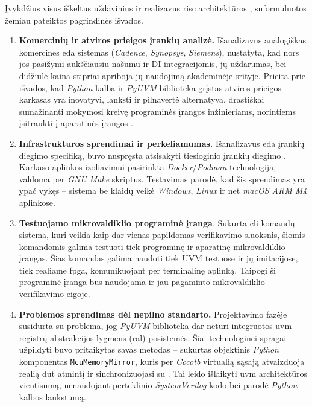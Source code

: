 
Įvykdžius visus iškeltus uždavinius ir realizavus \gls{risc} architektūros   , suformuluotos žemiau pateiktos pagrindinės išvados.

\begin{enumerate}
	\item \textbf{Komercinių ir atviros prieigos įrankių analizė.} Išanalizavus analogiškas komercines \gls{eda} sistemas (\textit{Cadence}, \textit{Synopsys}, \textit{Siemens}), nustatyta, kad nors jos pasižymi aukščiausiu našumu ir DI integracijomis, jų uždarumas,  bei didžiulė kaina stipriai apriboja jų naudojimą akademinėje srityje. Prieita prie išvados, kad \textit{Python} kalba ir \textit{PyUVM} biblioteka grįstas atviros prieigos karkasas yra inovatyvi, lanksti ir pilnavertė alternatyva, drastiškai sumažinanti mokymosi kreivę programinės įrangos inžinieriams, norintiems įsitraukti į aparatinės įrangos .
	
	\item \textbf{Infrastruktūros sprendimai ir perkeliamumas.} Išanalizavus \gls{eda} įrankių diegimo specifiką, buvo nuspręsta atsisakyti tiesioginio įrankių diegimo . Karkaso aplinkos izoliavimui pasirinkta \textit{Docker}/\textit{Podman}  technologija, valdoma per \textit{GNU Make} skriptus. Testavimas parodė, kad šis sprendimas yra ypač vykęs -- sistema be klaidų veikė \textit{Windows}, \textit{Linux} ir net \textit{macOS ARM M4} aplinkose.
	
	\item  \textbf{Testuojamo mikrovaldiklio programinė įranga}. Sukurta \gls{cli} komandų sistema, kuri veikia kaip dar vienas papildomas verifikavimo sluoksnis, šiomis komandomis galima testuoti tiek programinę ir aparatinę mikrovaldiklio įrangas. Šias komandas galima naudoti tiek UVM testuose ir jų imitacijose, tiek realiame \gls{fpga}, komunikuojant per terminalinę aplinką. Taipogi ši programinė įranga bus naudojama ir jau pagaminto mikrovaldiklio verifikavimo eigoje.
	
	\item \textbf{Problemos sprendimas dėl nepilno standarto.} Projektavimo fazėje susidurta su problema, jog \textit{PyUVM} biblioteka dar neturi integruotos \gls{uvm} registrų abstrakcijos lygmens (\gls{ral}) posistemės. Šiai technologinei spragai užpildyti buvo pritaikytas savas metodas -- sukurtas objektinis \textit{Python} komponentas \texttt{McuMemoryMirror}, kuris per \textit{Cocotb} virtualią sąsają atvaizduoja realią \gls{dut} atmintį ir sinchronizuojasi su . Tai leido išlaikyti \gls{uvm} architektūros vientisumą, nenaudojant perteklinio \textit{SystemVerilog} kodo bei parodė \textit{Python} kalbos lankstumą.
	

\end{enumerate}
